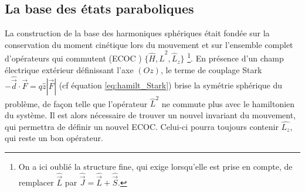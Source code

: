 \subsection{La base des états paraboliques}
\noindent	La construction de la base des harmoniques sphériques était fondée sur la conservation du moment cinétique lors du mouvement et sur l'ensemble complet d'opérateurs qui commutent (\og ECOC \fg{}) $\{\hat{H} , \hat{L}^2 , \hat{L}_z \}$
\footnote{
On a ici oublié la structure fine, qui exige lorsqu'elle est prise en compte, de remplacer $\hat{\vec{L}}$ par $\hat{\vec{J}}= \hat{\vec{L}}+\hat{\vec{S}}$.
}.%
En présence d'un champ électrique extérieur définissant l'axe $(Oz)$, le terme de couplage Stark $-\hat{\vec{d}}\cdot\vec{F} = q\hat{z}|\vec{F}|$ (cf équation \ref{eq:hamilt_Stark}) brise la symétrie sphérique du problème, de façon telle que l'opérateur $\hat{L}^2$ ne commute plus avec le hamiltonien du système.
Il est alors nécessaire de trouver un nouvel invariant du mouvement, qui permettra de définir un nouvel ECOC.
Celui-ci pourra toujours contenir $\hat{L_z}$, qui reste un bon opérateur.

